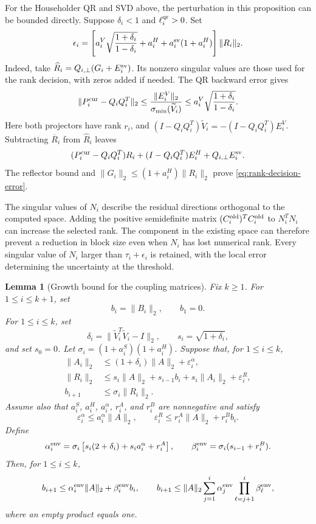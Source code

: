 \documentclass[11pt]{article}
\newtheorem{lemma}{Lemma}
\theoremstyle{definition}
\newcommand{\eps}{\varepsilon}
\begin{document}
For the Householder QR and SVD above, the perturbation in this proposition
can be bounded directly.  Suppose $\delta_i<1$ and
$\ell_i^{\rm qr}>0$.  Set
\begin{equation}
 \epsilon_i=
 \left[a_i^V\sqrt{\frac{1+\delta_i}{1-\delta_i}}
       +a_i^H+a_i^{\rm sv}(1+a_i^H)\right]\|R_i\|_2.
 \label{eq:rank-decision-error}
\end{equation}
Indeed, take $\widehat R_i=Q_{i,\perp}(G_i+E_i^{\rm sv})$.
Its nonzero singular values are those used for the rank decision, with zeros
added if needed.  The QR backward error gives
\[
 \|P_i^{\rm cur}-Q_iQ_i^T\|_2
 \le\frac{\|E_i^V\|_2}{\sigma_{\min}(\widetilde V_i)}
 \le a_i^V\sqrt{\frac{1+\delta_i}{1-\delta_i}}.
\]
Here both projectors have rank $r_i$, and
$(I-Q_iQ_i^T)\widetilde V_i=-(I-Q_iQ_i^T)E_i^V$.
Subtracting $\overline R_i$ from $\widehat R_i$ leaves
\[
 (P_i^{\rm cur}-Q_iQ_i^T)R_i
 +(I-Q_iQ_i^T)E_i^H+Q_{i,\perp}E_i^{\rm sv}.
\]
The reflector bound and $\|G_i\|_2\le(1+a_i^H)\|R_i\|_2$ prove
\eqref{eq:rank-decision-error}.

The singular values of $N_i$ describe the residual directions orthogonal
to the computed space. Adding the positive semidefinite matrix
$(C_i^{\rm old})^TC_i^{\rm old}$ to $N_i^TN_i$ can increase the selected
rank. The component in the existing space can therefore prevent a reduction
in block size even when $N_i$ has lost numerical rank.
Every singular value of $N_i$ larger than $\tau_i+\epsilon_i$ is retained,
with the local error determining the uncertainty at the threshold.

\begin{lemma}[Growth bound for the coupling matrices]
\label{lem:coefficient-envelope}
Fix $k\ge1$.  For $1\le i\le k+1$, set
\[
 b_i=\|B_i\|_2,
 \qquad b_1=0.
\]
For $1\le i\le k$, set
\[
 \delta_i=\|\widetilde V_i^T\widetilde V_i-I\|_2,
 \qquad s_i=\sqrt{1+\delta_i},
\]
and set $s_0=0$.  Let $\sigma_i=(1+a_i^S)(1+a_i^H)$.  Suppose that, for
$1\le i\le k$,
\begin{align*}
 \|A_i\|_2&\le(1+\delta_i)\|A\|_2+\eps_i^\alpha,\\
 \|R_i\|_2&\le s_i\|A\|_2+s_{i-1}b_i
                   +s_i\|A_i\|_2+\eps_i^R,\\
 b_{i+1}&\le\sigma_i\|R_i\|_2.
\end{align*}
Assume also that $a_i^S$, $a_i^H$, $a_i^\alpha$, $r_i^A$, and $r_i^B$ are
nonnegative and satisfy
\[
 \eps_i^\alpha\le a_i^\alpha\|A\|_2,
 \qquad
 \eps_i^R\le r_i^A\|A\|_2+r_i^B b_i.
\]
Define
\begin{equation}
 \alpha_i^{\rm env}=\sigma_i
 \left[s_i(2+\delta_i)+s_i a_i^\alpha+r_i^A\right],
 \qquad
 \beta_i^{\rm env}=\sigma_i(s_{i-1}+r_i^B).
 \label{eq:alpha-beta-envelope}
\end{equation}
Then, for $1\le i\le k$,
\begin{equation}
 b_{i+1}\le\alpha_i^{\rm env}\|A\|_2+\beta_i^{\rm env}b_i,
 \qquad
 b_{i+1}\le\|A\|_2\sum_{j=1}^{i}
   \alpha_j^{\rm env}\prod_{\ell=j+1}^{i}\beta_\ell^{\rm env},
 \label{eq:affine-envelope}
\end{equation}
where an empty product equals one.
\end{lemma}
\end{document}

